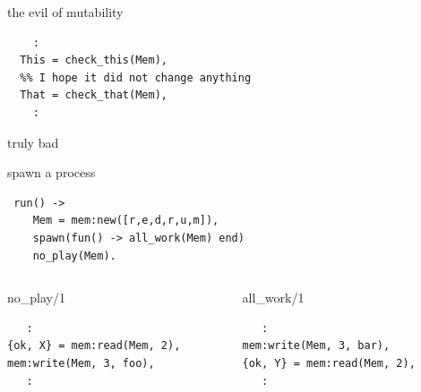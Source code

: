\begin{frame}[fragile]{the evil of mutability}

\pause
\begin{verbatim}
    :
  This = check_this(Mem),
  %% I hope it did not change anything
  That = check_that(Mem),
    :
\end{verbatim}

\end{frame}

\begin{frame}[fragile]{truly bad}

\begin{block}{spawn a process}
\begin{verbatim}
 run() ->
    Mem = mem:new([r,e,d,r,u,m]),
    spawn(fun() -> all_work(Mem) end)
    no_play(Mem).
\end{verbatim}
\end{block}

\pause
\begin{columns}
 \begin{column}{0.5\linewidth}
  \begin{block}{no\_play/1}
   \begin{verbatim}
   :
{ok, X} = mem:read(Mem, 2),
mem:write(Mem, 3, foo),
   :
   \end{verbatim}
  \end{block}
 \end{column}
 \begin{column}{0.5\linewidth}
  \begin{block}{all\_work/1}
   \begin{verbatim}
   :
mem:write(Mem, 3, bar),
{ok, Y} = mem:read(Mem, 2),
   :
   \end{verbatim}
  \end{block}
 \end{column}
\end{columns}


\end{frame}

